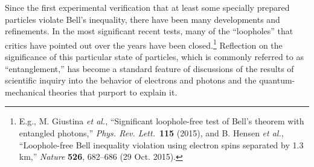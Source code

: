 Since the first experimental verification that at least some specially prepared particles violate Bell's inequality, there have been many developments and refinements. In the most significant recent tests, many of the ``loopholes'' that critics have pointed out over the years have been closed.\footnote{E.g., M. Giustina \emph{et al.}, 
``Significant loophole-free test of Bell's theorem with entangled photons,'' \emph{Phys. Rev. Lett.}\  
\textbf{115} (2015), and B. Hensen \emph{et al.}, ``Loophole-free
Bell inequality violation using electron spins separated by 1.3 km,'' \emph{Nature} \textbf{526}, 682--686 (29 Oct. 2015).}
Reflection on the significance of this particular state of particles, which is commonly referred to as ``entanglement,'' has become a standard feature of discussions of the results of scientific inquiry into the behavior of electrons and photons and the quantum-mechanical theories that purport to explain it.

